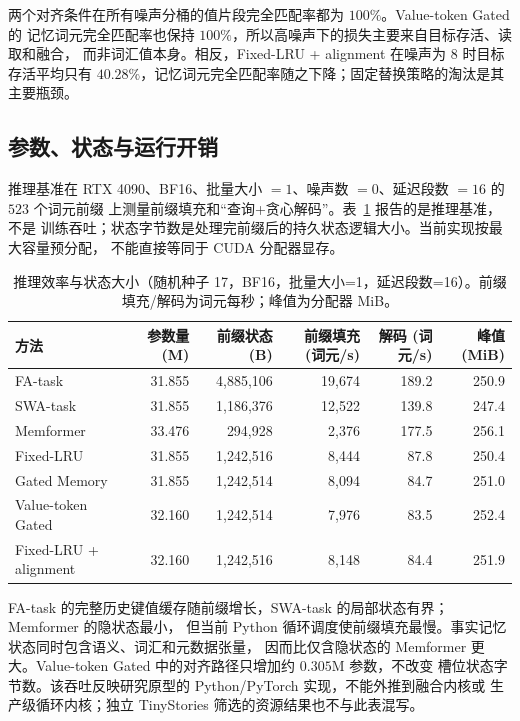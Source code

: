 \documentclass[letterpaper]{article}
\begin{document}
两个对齐条件在所有噪声分桶的值片段完全匹配率都为 $100\%$。Value-token Gated 的
记忆词元完全匹配率也保持 $100\%$，所以高噪声下的损失主要来自目标存活、读取和融合，
而非词汇值本身。相反，Fixed-LRU + alignment 在噪声为 $8$ 时目标存活平均只有
$40.28\%$，记忆词元完全匹配率随之下降；固定替换策略的淘汰是其主要瓶颈。

\subsection{参数、状态与运行开销}

推理基准在 RTX 4090、BF16、批量大小 $=1$、噪声数 $=0$、延迟段数 $=16$ 的 $523$ 个词元前缀
上测量前缀填充和“查询+贪心解码”。表~\ref{tab:efficiency} 报告的是推理基准，不是
训练吞吐；状态字节数是处理完前缀后的持久状态逻辑大小。当前实现按最大容量预分配，
不能直接等同于 CUDA 分配器显存。

\begin{table}[t]
\centering
\scriptsize
\caption{推理效率与状态大小（随机种子 17，BF16，批量大小=1，延迟段数=16）。前缀填充/解码为词元每秒；峰值为分配器 MiB。}
\label{tab:efficiency}
\begin{tabular}{lrrrrr}
\toprule
方法 & 参数量 (M) & 前缀状态 (B) & 前缀填充 (词元/s) & 解码 (词元/s) & 峰值 (MiB) \\
\midrule
FA-task & 31.855 & 4,885,106 & 19,674 & 189.2 & 250.9 \\
SWA-task & 31.855 & 1,186,376 & 12,522 & 139.8 & 247.4 \\
Memformer & 33.476 & 294,928 & 2,376 & 177.5 & 256.1 \\
Fixed-LRU & 31.855 & 1,242,516 & 8,444 & 87.8 & 250.4 \\
Gated Memory & 31.855 & 1,242,514 & 8,094 & 84.7 & 251.0 \\
Value-token Gated & 32.160 & 1,242,514 & 7,976 & 83.5 & 252.4 \\
Fixed-LRU + alignment & 32.160 & 1,242,516 & 8,148 & 84.4 & 251.9 \\
\bottomrule
\end{tabular}
\end{table}

FA-task 的完整历史键值缓存随前缀增长，SWA-task 的局部状态有界；Memformer 的隐状态最小，
但当前 Python 循环调度使前缀填充最慢。事实记忆状态同时包含语义、词汇和元数据张量，
因而比仅含隐状态的 Memformer 更大。Value-token Gated 中的对齐路径只增加约 $0.305$M 参数，不改变
槽位状态字节数。该吞吐反映研究原型的 Python/PyTorch 实现，不能外推到融合内核或
生产级循环内核；独立 TinyStories 筛选的资源结果也不与此表混写。
\end{document}
